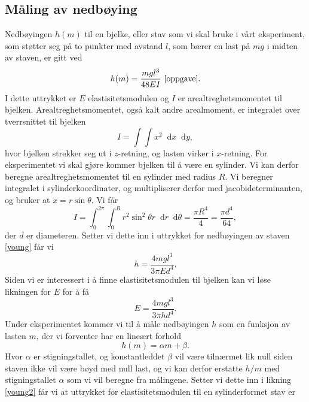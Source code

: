 \documentclass[%
 reprint,
 amsmath,amssymb,
 aps,
 norsk,
 booktabs
]{revtex4-1}
\newcommand*\diff{\mathop{}\!\mathrm{d}}
\begin{document}
\subsection{Måling av nedbøying}
Nedbøyingen $h(m)$ til en bjelke, eller stav som vi skal bruke i vårt eksperiment, som støtter seg på to punkter med avstand $l$, som bærer en last på $mg$ i midten av staven, er gitt ved
\begin{equation}
  h(m) = \frac{mgl^3}{48EI} \,\,\label{young} \cite{oppgave}.
\end{equation}
I dette uttrykket er $E$ elastisitetsmodulen og $I$ er arealtreghetsmomentet til bjelken. Arealtreghetsmomentet, også kalt andre arealmoment, er integralet over tverrsnittet til bjelken
\begin{equation*}
  I = \int\int x^2 \diff x \diff y,
\end{equation*}hvor bjelken strekker seg ut i $z$-retning, og lasten virker i $x$-retning. For eksperimentet vi skal gjøre kommer bjelken til å være en sylinder. Vi kan derfor beregne arealtreghetsmomentet til en sylinder med radius $R$. Vi beregner integralet i sylinderkoordinater, og multipliserer derfor med jacobideterminanten, og bruker at $x = r\sin{\theta}$. Vi får
\begin{equation*}
  I = \int_0^{2\pi} \int_0^R r^2\sin^2{\theta}r \diff r \diff \theta = \frac{\pi R^4}{4} = \frac{\pi d^4}{64},
\end{equation*}
der $d$ er diameteren. Setter vi dette inn i  uttrykket for nedbøyingen av staven \eqref{young} får vi
\begin{equation*}
  h = \frac{4mgl^3}{3\pi Ed^4}.
\end{equation*}
Siden vi er interessert i å finne elastisitetsmodulen til bjelken kan vi løse likningen for $E$ for å få
\begin{equation}
  E = \frac{4mgl^3}{3\pi hd^4}. \label{young2}
\end{equation}
Under eksperimentet kommer vi til å måle nedbøyingen $h$ som en funksjon av lasten $m$, der vi forventer har en lineært forhold
\begin{equation*}
  h(m) = \alpha m + \beta.
\end{equation*}
Hvor $\alpha$ er stigningstallet, og konstantleddet $\beta$ vil være tilnærmet lik null siden staven ikke vil være bøyd med null last, og vi kan derfor erstatte $h/m$ med stigningstallet $\alpha$ som vi vil beregne fra målingene. Setter vi dette inn i likning \eqref{young2} får vi at uttrykket for elastisitetsmodulen til en sylinderformet stav er
\end{document}
